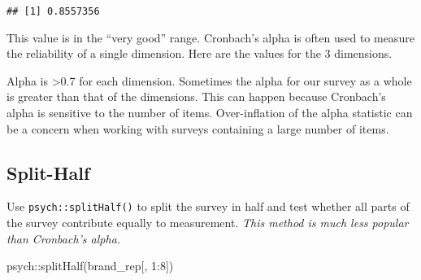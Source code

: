 \documentclass[
]{book}
\newenvironment{Shaded}{\begin{snugshade}}{\end{snugshade}}
\newcommand{\CommentTok}[1]{\textcolor[rgb]{0.56,0.35,0.01}{\textit{#1}}}
\newcommand{\DecValTok}[1]{\textcolor[rgb]{0.00,0.00,0.81}{#1}}
\newcommand{\DocumentationTok}[1]{\textcolor[rgb]{0.56,0.35,0.01}{\textbf{\textit{#1}}}}
\newcommand{\FunctionTok}[1]{\textcolor[rgb]{0.00,0.00,0.00}{#1}}
\newcommand{\NormalTok}[1]{#1}
\newcommand{\SpecialCharTok}[1]{\textcolor[rgb]{0.00,0.00,0.00}{#1}}
\theoremstyle{definition}
\theoremstyle{definition}
\theoremstyle{definition}
\theoremstyle{definition}
\theoremstyle{remark}
\begin{document}
\begin{verbatim}
## [1] 0.8557356
\end{verbatim}

This value is in the ``very good'' range. Cronbach's alpha is often used to measure the reliability of a single dimension. Here are the values for the 3 dimensions.

\begin{Shaded}
\end{Shaded}

Alpha is \textgreater0.7 for each dimension. Sometimes the alpha for our survey as a whole is greater than that of the dimensions. This can happen because Cronbach's alpha is sensitive to the number of items. Over-inflation of the alpha statistic can be a concern when working with surveys containing a large number of items.

\hypertarget{split-half}{%
\subsection{Split-Half}\label{split-half}}

Use \texttt{psych::splitHalf()} to split the survey in half and test whether all parts of the survey contribute equally to measurement. \emph{This method is much less popular than Cronbach's alpha.}

\begin{Shaded}
\begin{Highlighting}[]
\NormalTok{psych}\SpecialCharTok{::}\FunctionTok{splitHalf}\NormalTok{(brand\_rep[, }\DecValTok{1}\SpecialCharTok{:}\DecValTok{8}\NormalTok{])}
\end{Highlighting}
\end{Shaded}
\end{document}

